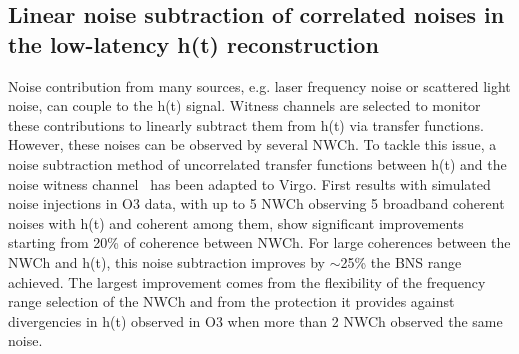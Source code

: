 \documentclass{moriond}
\begin{document}
\subsection{Linear noise subtraction of correlated noises in the low-latency h(t) reconstruction}
Noise contribution from many sources, e.g. laser frequency noise or scattered light noise, can couple to the h(t) signal. Witness channels are selected to monitor these contributions to linearly subtract them from h(t) via transfer functions. However, these noises can be observed by several NWCh. To tackle this issue, a noise subtraction method of uncorrelated transfer functions  between h(t) and the noise witness channel~\cite{5}  has been adapted to Virgo. First results with simulated noise injections in O3 data, with up to 5 NWCh observing 5 broadband coherent noises with h(t) and coherent among them, show significant improvements starting from 20\% of coherence between NWCh. For large coherences between the NWCh and h(t), this noise subtraction improves by $\sim$25\% the BNS range achieved. The largest improvement comes from the flexibility of the frequency range selection of the NWCh and from the protection it provides against divergencies in h(t) observed in O3 when more than 2 NWCh observed the same noise.

%
%
\end{document}
